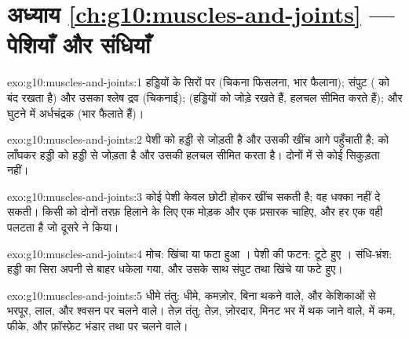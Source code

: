 \section*{अध्याय \ref{ch:g10:muscles-and-joints} --- पेशियाँ और संधियाँ}

\begin{solution}{exo:g10:muscles-and-joints:1}
हड्डियों के सिरों पर  (चिकना फिसलना, भार फैलाना); संपुट ( को
बंद रखता है) और उसका श्लेष द्रव (चिकनाई);  (हड्डियों को जोड़े रखते
हैं, हलचल सीमित करते हैं); और घुटने में अर्धचंद्रक (भार फैलाते हैं)।
\end{solution}

\begin{solution}{exo:g10:muscles-and-joints:2}
 पेशी को हड्डी से जोड़ती है और उसकी खींच आगे पहुँचाती है; 
 को लाँघकर हड्डी को हड्डी से जोड़ता है और उसकी हलचल सीमित करता है।
दोनों में से कोई सिकुड़ता नहीं।
\end{solution}

\begin{solution}{exo:g10:muscles-and-joints:3}
कोई पेशी केवल छोटी होकर खींच सकती है; वह धक्का नहीं दे सकती। किसी  को
दोनों तरफ़ हिलाने के लिए एक मोड़क और एक प्रसारक चाहिए, और हर एक वही
पलटता है जो दूसरे ने किया।
\end{solution}

\begin{solution}{exo:g10:muscles-and-joints:4}
मोच: खिंचा या फटा हुआ । पेशी की फटन: टूटे हुए ।
संधि-भ्रंश: हड्डी का सिरा अपनी  से बाहर धकेला गया, और उसके साथ संपुट
तथा  खिंचे या फटे हुए।
\end{solution}

\begin{solution}{exo:g10:muscles-and-joints:5}
धीमे तंतु: धीमे, कमज़ोर, बिना थकने वाले,  और केशिकाओं से
भरपूर, लाल, और श्वसन पर चलने वाले। तेज़ तंतु: तेज़, ज़ोरदार, मिनट भर में
थक जाने वाले,  में कम, फीके, और फ़ॉस्फ़ेट भंडार तथा  पर
चलने वाले।
\end{solution}

